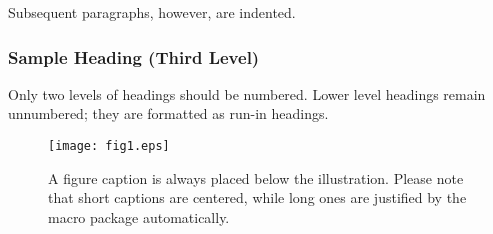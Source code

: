 \documentclass[runningheads]{llncs}
\begin{document}
Subsequent paragraphs, however, are indented.

\subsubsection{Sample Heading (Third Level)} Only two levels of
headings should be numbered. Lower level headings remain unnumbered;
they are formatted as run-in headings.



\begin{figure}
\texttt{[image: fig1.eps]}
\caption{A figure caption is always placed below the illustration.
Please note that short captions are centered, while long ones are
justified by the macro package automatically.} \label{fig1}
\end{figure}

\fi
\end{document}
